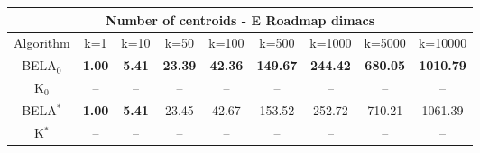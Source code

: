 \begin{tabular}{c|cccccccc}\toprule
\multicolumn{9}{c}{Number of centroids - E Roadmap dimacs}\\ \midrule
Algorithm & k=1 & k=10 & k=50 & k=100 & k=500 & k=1000 & k=5000 & k=10000 \\ \midrule
BELA$_0$ & \textbf{1.00} & \textbf{5.41} & \textbf{23.39} & \textbf{42.36} & \textbf{149.67} & \textbf{244.42} & \textbf{680.05} & \textbf{1010.79} \\
K$_0$ & -- & -- & -- & -- & -- & -- & -- & -- \\
BELA$^*$ & \textbf{1.00} & \textbf{5.41} & 23.45 & 42.67 & 153.52 & 252.72 & 710.21 & 1061.39 \\
K$^*$ & -- & -- & -- & -- & -- & -- & -- & -- \\ \bottomrule 
\end{tabular}
